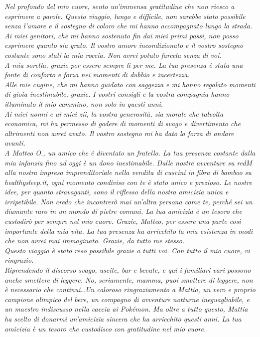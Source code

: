 \cleardoublepage
\thispagestyle{empty}
\begin{flushright}
    \itshape %
    Nel profondo del mio cuore, sento un’immensa gratitudine che non riesco a esprimere a parole. Questo viaggio, lungo e difficile, non sarebbe stato possibile senza l’amore e il sostegno di coloro che mi hanno accompagnato lungo la strada.
    \\
    Ai miei genitori, che mi hanno sostenuto fin dai miei primi passi, non posso esprimere quanto sia grato. Il vostro amore incondizionato e il vostro sostegno costante sono stati la mia roccia. Non avrei potuto farcela senza di voi.
    \\
    A mia sorella, grazie per essere sempre lì per me. La tua presenza è stata una fonte di conforto e forza nei momenti di dubbio e incertezza.
    \\
    Alle mie cugine, che mi hanno guidato con saggezza e mi hanno regalato momenti di gioia inestimabile, grazie. I vostri consigli e la vostra compagnia hanno illuminato il mio cammino, non solo in questi anni.
    \\
    Ai miei nonni e ai miei zii, la vostra generosità, sia morale che talvolta economica, mi ha permesso di godere di momenti di svago e divertimento che altrimenti non avrei avuto. Il vostro sostegno mi ha dato la forza di andare avanti.
    \\
    A Matteo O., un amico che è diventato un fratello. La tua presenza costante dalla mia infanzia fino ad oggi è un dono inestimabile. Dalle nostre avventure su redM alla nostra impresa imprenditoriale nella vendita di cuscini in fibra di bamboo su healthysleep.it\textregistered, ogni momento condiviso con te è stato unico e prezioso. Le nostre idee, per quanto stravaganti, sono il riflesso della nostra amicizia unica e irripetibile. Non credo che incontrerò mai un’altra persona come te, perché sei un diamante raro in un mondo di pietre comuni. La tua amicizia è un tesoro che custodirò per sempre nel mio cuore. Grazie, Matteo, per essere una parte così importante della mia vita. La tua presenza ha arricchito la mia esistenza in modi che non avrei mai immaginato. Grazie, da tutto me stesso.
    \\
    Questo viaggio è stato reso possibile grazie a tutti voi. Con tutto il mio cuore, vi ringrazio.
    \\
    Riprendendo il discorso svago, uscite, bar e bevute, e qui i familiari vari possono anche smettere di leggere. No, seriamente, mamma, puoi smettere di leggere, non è necessario che continui\dots Un caloroso ringraziamento a Mattia, un vero e proprio campione olimpico del bere, un compagno di avventure notturne ineguagliabile, e un maestro indiscusso nella caccia ai Pokémon. Ma oltre a tutto questo, Mattia ha scelto di donarmi un’amicizia sincera che ha arricchito questi anni. La tua amicizia è un tesoro che custodisco con gratitudine nel mio cuore.

\end{flushright}
